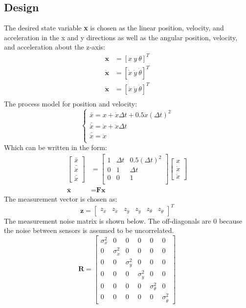 \documentclass[12pt,letterpaper,titlepage]{report}
\begin{document}
\subsection{Design}
The desired state variable \textbf{x} is chosen as the linear position, velocity, and acceleration in the x and y directions as well as the angular position, velocity, and acceleration about the z-axis:
\begin{align*}
\textbf{x} &= [x\ y\ \theta]^T\\
\dot{\textbf{x}} &= [\dot{x}\ \dot{y}\ \dot{\theta}]^T\\
\ddot{\textbf{x}} &= [\ddot{x}\ \ddot{y}\ \ddot{\theta}]^T\\
\end{align*}
The process model for position and velocity:
\[ \begin{cases} 
	\bar{x}=x+\dot{x}\Delta t+0.5\ddot{x}(\Delta t)^2\\
	\bar{\dot{x}}=\dot{x}+\ddot{x}\Delta t\\
	\bar{\ddot{x}}=\ddot{x}\\
\end{cases} \]
Which can be written in the form:
\begin{align*}
\begin{bmatrix}\bar{x}\\ \bar{\dot{x}}\\ \bar{\ddot{x}} \end{bmatrix} &=
\begin{bmatrix}1 & \Delta t & 0.5(\Delta t)^2 \\
0 & 1 & \Delta t \\
0 & 0 & 1 \\\end{bmatrix}
\begin{bmatrix}x\\ \dot{x}\\ \ddot{x} \end{bmatrix}\\ 
\bar{\textbf{x}}&=\textbf{F}\textbf{x}
\end{align*}
The measurement vector is chosen as:
\[\textbf{z}=
\begin{bmatrix}z_x & z_{\ddot{x}} & z_y & z_{\ddot{y}} & z_{\theta} & z_{\dot{\theta}} \end{bmatrix}^T\]
The measurement noise matrix is shown below. The off-diagonals are 0 because the noise between sensors is assumed to be uncorrelated.
\[\textbf{R}=
\begin{bmatrix}\sigma^2_x & 0 & 0 & 0 &0 & 0\\
0 & \sigma^2_{\ddot{x}} & 0 & 0 & 0 & 0\\
0 & 0 & \sigma^2_y & 0 & 0 & 0 \\
0 & 0 & 0 & \sigma^2_{\ddot{y}} & 0 & 0\\
0 & 0 & 0 & 0 & \sigma^2_{\theta} & 0\\
0 & 0 & 0 & 0 & 0 & \sigma^2_{\dot{\theta}} \end{bmatrix}\]
\end{document}
